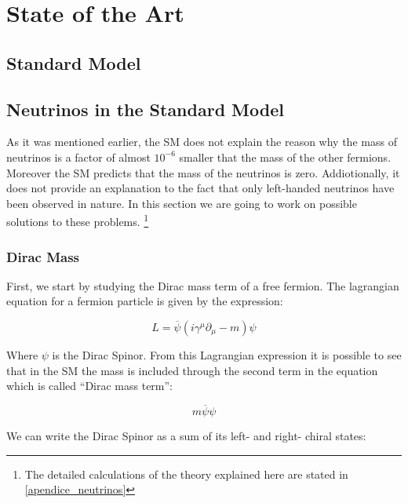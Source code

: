\chapter{State of the Art} 

\section{Standard Model}


\section{Neutrinos in the Standard Model}

As it was mentioned earlier, the SM does not explain the reason why the mass of neutrinos is a factor of almost $10^{-6}$ smaller that the mass of the other fermions. Moreover the SM predicts that
the mass of the neutrinos is zero. Addiotionally, it does not provide an explanation to the fact that only left-handed neutrinos have been observed in nature. 
In this section we are going to work on possible solutions to these problems. \footnote{The detailed calculations of the theory explained here are stated in \ref{apendice_neutrinos}}

\subsection{Dirac Mass}

First, we start by studying the Dirac mass term of a free fermion. The lagrangian equation for a fermion particle is given by the expression:

\begin{equation}
 L = \overline{\psi} \left( i \gamma ^\mu \partial_{\mu} - m \right) \psi
\end{equation}

Where $\psi$ is the Dirac Spinor. From this Lagrangian expression it is possible to see that in the SM the mass is included through the second term in the equation which is called ``Dirac mass term'':

\begin{equation}
 m \overline{\psi} \psi
\end{equation}

We can write the Dirac Spinor as a sum of its left- and right- chiral states:


